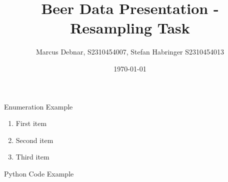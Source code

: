 \documentclass{beamer}
\title{Beer Data Presentation - Resampling Task}
\author{Marcus Debnar, S2310454007, Stefan Habringer S2310454013}
\date{\today}
\begin{document}
\begin{frame}
  \titlepage
\end{frame}

\begin{frame}{Enumeration Example}
  \begin{enumerate}
    \item First item
    \item Second item
    \item Third item
  \end{enumerate}
\end{frame}

\begin{frame}{Python Code Example}  
  
\end{frame}

\end{document}

